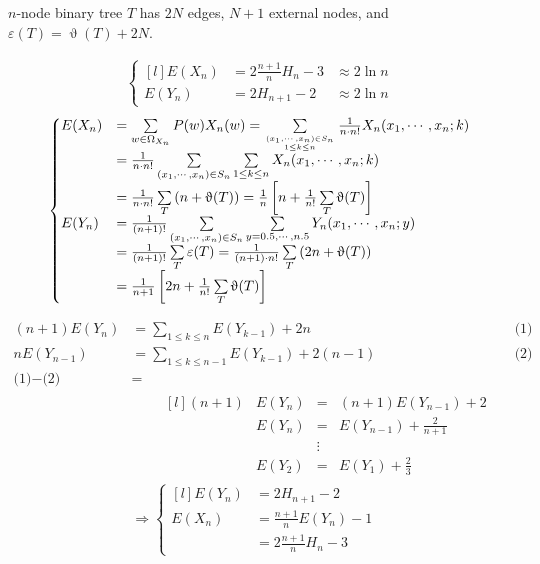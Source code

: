 \documentclass[12pt,a4paper,oneside]{report}
\begin{document}
\begin{theorem}
$n$-node binary tree $T$ has $2N$ edges, $N+1$ external nodes, and $\varepsilon(T)=\upvartheta(T)+2N$. 
\end{theorem}

\begin{theorem}
\begin{align*}
	\left\{\begin{matrix*}[l]
		E(X_n) &= 2 \frac{n+1}{n} H_n - 3 &\approx 2 \ln n \\
		E(Y_n) &= 2 H_{n+1} - 2 &\approx 2 \ln n
	\end{matrix*}\right.
\end{align*}
\begin{align*}
	\left\{\begin{matrix*}[l]
		E(X_n) 
			&= \sum\limits_{w \in \Omega_{X_n} } P(w) X_n(w) 
				= \sum\limits_{(x_1, \cdots, x_n) \in S_n \atop 1 \le k \le n} 
					\frac{1}{n \cdot n!} X_n (x_1, \cdots, x_n ; k) \\
			&= \frac{1}{n \cdot n!} 
				\sum\limits_{(x_1, \cdots, x_n) \in S_n} \sum\limits_{1 \le k \le n} 
					X_n (x_1, \cdots, x_n ; k) \\
			&= \frac{1}{n \cdot n!} \sum\limits_{T} \left(n + \upvartheta(T) \right) 
				= \frac{1}{n} 
					\left[ n + \frac{1}{n!} \sum\limits_{T} \upvartheta(T)\right]\\
		E(Y_n) 
			&= \frac{1}{(n+1)!} \sum\limits_{(x_1, \cdots, x_n) \in S_n}
					\sum\limits_{y = 0.5, \cdots, n.5} Y_n(x_1 , \cdots, x_n ; y) \\
			&= \frac{1}{(n+1)!} \sum\limits_{T} \varepsilon(T) 
				= \frac{1}{(n+1) \cdot n!} \sum\limits_{T} \left(2n + \upvartheta(T)\right) \\
			&= \frac{1}{n+1} \left[2n + \frac{1}{n!} \sum\limits_{T} \upvartheta(T)\right]
	\end{matrix*}\right.
\end{align*}
\end{theorem}

\begin{align*}
	(n+1) E(Y_n) &= \sum\limits_{1 \le k \le n} E(Y_{k-1}) + 2n 
		&& \text{(1)} \\
	n E(Y_{n-1}) &= \sum\limits_{1 \le k \le n-1} E(Y_{k-1}) + 2(n-1)
		&& \text{(2)} \\
	\text{(1)} - \text{(2)} &=\\
		& \qquad
		\begin{matrix*}[l]
		 	(n+1) &E(Y_n) &=& (n+1) E(Y_{n-1}) + 2 \\
			&E(Y_n) &=& E(Y_{n-1}) + \frac{2}{n+1} \\
			& & \vdots &\\
			&E(Y_2) &=& E(Y_1) + \frac{2}{3}
		\end{matrix*} \\
	&\Rightarrow
		\left\{\begin{matrix*}[l]
			E(Y_n) &= 2 H_{n+1} - 2 \\
			E(X_n) &= \frac{n+1}{n} E(Y_{n}) - 1 \\
				&= 2 \frac{n+1}{n} H_n - 3
		\end{matrix*}\right.
\end{align*}
\end{document}
